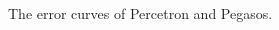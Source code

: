 \documentclass{article}
\begin{document}
\begin{figure}[H]
\begin{adjustwidth}{-4em}{-4em}

     \hfill
     
     \hfill
     \caption{The error curves of Percetron and Pegasos.}
     \label{fig:dummy}
    \end{adjustwidth}
   \end{figure}
   
\end{document}
